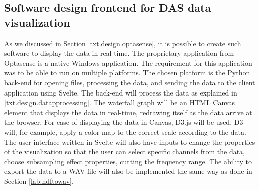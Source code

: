 






\subsection{Software design frontend for DAS data visualization}\label{txt.design.frontend.dataviz}

As we discussed in Section \ref{txt.design.optasense}, it is possible to create such software to display the data in real time. The proprietary application from Optasense is a native Windows application. The requirement for this application was to be able to run on multiple platforms. The chosen platform is the Python back-end for opening files, processing the data, and sending the data to the client application using Svelte. The back-end will process the data as explained in \ref{txt.design.datapprocessing}. The waterfall graph will be an HTML Canvas element that displays the data in real-time, redrawing itself as the data arrive at the browser. For ease of displaying the data in Canvas, D3.js will be used. D3 will, for example, apply a color map to the correct scale according to the data. The user interface written in Svelte will also have inputs to change the properties of the visualization so that the user can select specific channels from the data, choose subsampling effect properties, cutting the frequency range. The ability to export the data to a WAV file will also be implemented the same way as done in Section \ref{lab:hdftowav}.

